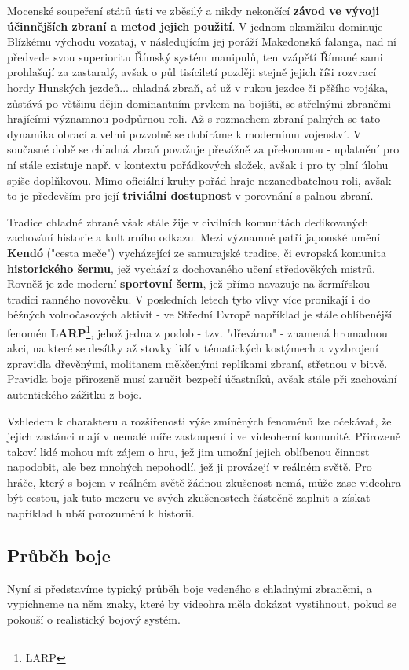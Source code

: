 Mocenské soupeření států ústí ve zběsilý a nikdy nekončící \textbf{závod ve vývoji účinnějších zbraní a metod jejich použití}. V jednom okamžiku dominuje Blízkému východu vozataj, v následujícím jej poráží Makedonská falanga, nad ní předvede svou superioritu Římský systém manipulů, ten vzápětí Římané sami prohlašují za zastaralý, avšak o půl tisíciletí později stejně jejich říši rozvrací hordy Hunských jezdců... chladná zbraň, ať už v rukou jezdce či pěšího vojáka, zůstává po většinu dějin dominantním prvkem na bojišti, se střelnými zbraněmi hrajícími významnou podpůrnou roli. Až s rozmachem zbraní palných se tato dynamika obrací a velmi pozvolně se dobíráme k modernímu vojenství. V současné době se chladná zbraň považuje převážně za překonanou - uplatnění pro ní stále existuje např. v kontextu pořádkových složek, avšak i pro ty plní úlohu spíše doplňkovou. Mimo oficiální kruhy pořád hraje nezanedbatelnou roli, avšak to je především pro její \textbf{triviální dostupnost} v porovnání s palnou zbraní.

Tradice chladné zbraně však stále žije v civilních komunitách dedikovaných zachování historie a kulturního odkazu. Mezi významné patří japonské umění \textbf{Kendó} ("cesta meče") vycházející ze samurajské tradice, či evropská komunita \textbf{historického šermu}, jež vychází z dochovaného učení středověkých mistrů. Rovněž je zde moderní \textbf{sportovní šerm}, jež přímo navazuje na šermířskou tradici ranného novověku. V posledních letech tyto vlivy více pronikají i do běžných volnočasových aktivit - ve Střední Evropě například je stále oblíbenější fenomén \textbf{LARP}\footnote{\ac{LARP}}, jehož jedna z podob - tzv. "dřevárna" - znamená hromadnou akci, na které se desítky až stovky lidí v tématických kostýmech a vyzbrojení zpravidla dřevěnými, molitanem měkčenými replikami zbraní, střetnou v bitvě. Pravidla boje přirozeně musí zaručit bezpečí účastníků, avšak stále při zachování autentického zážitku z boje.  

Vzhledem k charakteru a rozšířenosti výše zmíněných fenoménů lze očekávat, že jejich zastánci mají v nemalé míře zastoupení i ve videoherní komunitě. Přirozeně takoví lidé mohou mít zájem o hru, jež jim umožní jejich oblíbenou činnost napodobit, ale bez mnohých nepohodlí, jež ji provázejí v reálném světě. Pro hráče, který s bojem v reálném světě žádnou zkušenost nemá, může zase videohra být cestou, jak tuto mezeru ve svých zkušenostech částečně zaplnit a získat například hlubší porozumění k historii.

\subsection{Průběh boje}
Nyní si představíme typický průběh boje vedeného s chladnými zbraněmi, a vypíchneme na něm znaky, které by videohra měla dokázat vystihnout, pokud se pokouší o realistický bojový systém.
\bigbreak

